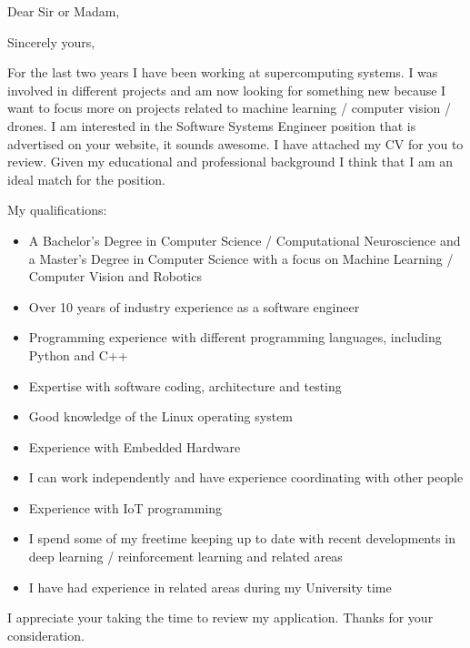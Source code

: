 






%
\date{\today} %
\opening{Dear Sir or Madam,} %
\closing{Sincerely yours,} %
%
\makelettertitle %
%

For the last two years I have been working at supercomputing systems. I was involved in different projects and am now looking for something new because I want to focus more on projects related to machine learning / computer vision / drones.
\newline
I am interested in the Software Systems Engineer position that is advertised on your website, it sounds awesome. I have attached my CV for you to review. Given my educational and professional background I think that I am an ideal match for the position. 

My qualifications:
\begin{itemize}
	\item A Bachelor's Degree in Computer Science / Computational Neuroscience and a Master's Degree in Computer Science with a focus on Machine Learning / Computer Vision and Robotics
	\item Over 10 years of industry experience as a software engineer
	\item Programming experience with different programming languages, including Python and C++
	\item Expertise with software coding, architecture and testing
	\item Good knowledge of the Linux operating system
	\item Experience with Embedded Hardware
	\item I can work independently and have experience coordinating with other people
	\item Experience with IoT programming
	\item I spend some of my freetime keeping up to date with recent developments in deep learning / reinforcement learning and related areas
	\item I have had experience in related areas during my University time
\end{itemize}

I appreciate your taking the time to review my application. Thanks for your consideration.
\newline

%
\makeletterclosing %
%
\newpage

